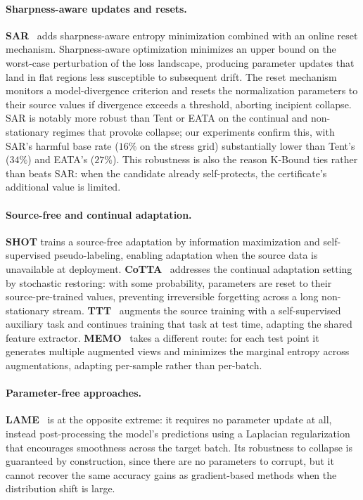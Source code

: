 \paragraph{Sharpness-aware updates and resets.}
\textbf{SAR}~\cite{niu2023sar} adds sharpness-aware entropy minimization
combined with an online reset mechanism.
Sharpness-aware optimization minimizes an upper bound on the worst-case
perturbation of the loss landscape, producing parameter updates that land in
flat regions less susceptible to subsequent drift.
The reset mechanism monitors a model-divergence criterion and resets the
normalization parameters to their source values if divergence exceeds a
threshold, aborting incipient collapse.
SAR is notably more robust than Tent or EATA on the continual and
non-stationary regimes that provoke collapse; our experiments confirm this,
with SAR's harmful base rate ($16\%$ on the stress grid) substantially lower
than Tent's ($34\%$) and EATA's ($27\%$).
This robustness is also the reason K-Bound ties rather than beats SAR:
when the candidate already self-protects, the certificate's additional value
is limited.

\paragraph{Source-free and continual adaptation.}
\textbf{SHOT} trains a source-free adaptation by information maximization and
self-supervised pseudo-labeling, enabling adaptation when the source data is
unavailable at deployment.
\textbf{CoTTA}~\cite{wang2022cotta} addresses the continual adaptation setting
by stochastic restoring: with some probability, parameters are reset to their
source-pre-trained values, preventing irreversible forgetting across a long
non-stationary stream.
\textbf{TTT}~\cite{sun2020ttt} augments the source training with a
self-supervised auxiliary task and continues training that task at test time,
adapting the shared feature extractor.
\textbf{MEMO}~\cite{zhang2022memo} takes a different route: for each test
point it generates multiple augmented views and minimizes the marginal entropy
across augmentations, adapting per-sample rather than per-batch.

\paragraph{Parameter-free approaches.}
\textbf{LAME}~\cite{boudiaf2022lame} is at the opposite extreme: it requires
no parameter update at all, instead post-processing the model's predictions
using a Laplacian regularization that encourages smoothness across the target
batch.
Its robustness to collapse is guaranteed by construction, since there are no
parameters to corrupt, but it cannot recover the same accuracy gains as
gradient-based methods when the distribution shift is large.

